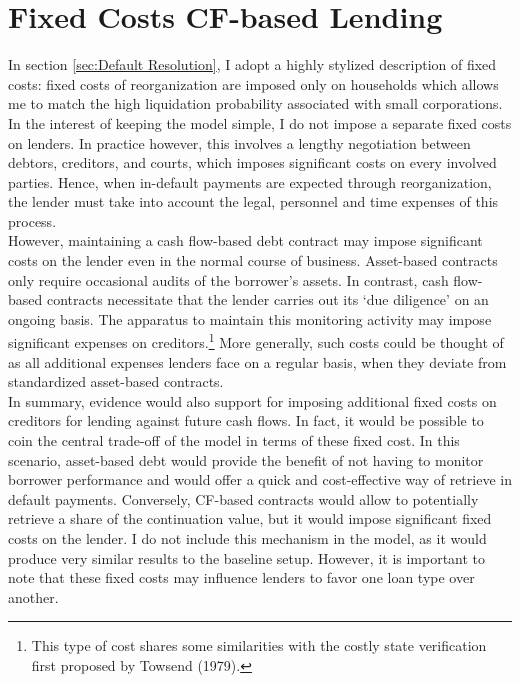 \documentclass[12pt]{article}
\begin{document}
\section{Fixed Costs CF-based Lending \label{sec:fixed costs}}
In section \ref{sec:Default Resolution}, I adopt a highly stylized description of fixed costs: fixed costs of reorganization are imposed only on households which allows me to match the high liquidation probability associated with small corporations. In the interest of keeping the model simple, I do not impose a separate fixed costs on lenders. In practice however, this involves a lengthy negotiation between debtors, creditors, and courts, which imposes significant costs on every involved parties. Hence, when in-default payments are expected through reorganization, the lender must take into account the legal, personnel and time expenses of this process. \vspace{3mm} \\
However, maintaining a cash flow-based debt contract may impose significant costs on the lender even in the normal course of business. Asset-based contracts only require occasional audits of the borrower's assets. In contrast, cash flow-based contracts necessitate that the lender carries out its `due diligence' on an ongoing basis. The apparatus to maintain this monitoring activity may impose significant expenses on creditors.\footnote{This type of cost shares some similarities with the costly state verification first proposed by Towsend (1979).} More generally, such costs could be thought of as all additional expenses lenders face on a regular basis, when they deviate from standardized asset-based contracts.
\vspace{3mm} \\
In summary, evidence would also support for imposing additional fixed costs on creditors for lending against future cash flows. In fact, it would be possible to coin the central trade-off of the model in terms of these fixed cost. In this scenario, asset-based debt would provide the benefit of not having to monitor borrower performance and would offer a quick and cost-effective way of retrieve in default payments. Conversely, CF-based contracts would allow to potentially retrieve a share of the continuation value, but it would impose significant fixed costs on the lender. I do not include this mechanism in the model, as it would produce very similar results to the baseline setup. However, it is important to note that these fixed costs may influence lenders to favor one loan type over another.
\end{document}
